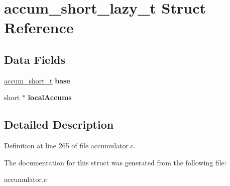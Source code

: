 \hypertarget{structaccum__short__lazy__t}{\section{accum\-\_\-short\-\_\-lazy\-\_\-t Struct Reference}
\label{structaccum__short__lazy__t}
}
\subsection*{Data Fields}
\begin{DoxyCompactItemize}
\item 
\hypertarget{structaccum__short__lazy__t_a1a0a6192758e6bbb414c27b4cf69623b}{\hyperlink{structaccum__short__t}{accum\-\_\-short\-\_\-t} {\bfseries base}}\label{structaccum__short__lazy__t_a1a0a6192758e6bbb414c27b4cf69623b}

\item 
\hypertarget{structaccum__short__lazy__t_a4c0bec8d0c751ee8120b5f4381fec482}{short $\ast$ {\bfseries local\-Accums}}\label{structaccum__short__lazy__t_a4c0bec8d0c751ee8120b5f4381fec482}

\end{DoxyCompactItemize}


\subsection{Detailed Description}


Definition at line 265 of file accumulator.\-c.



The documentation for this struct was generated from the following file\-:\begin{DoxyCompactItemize}
\item 
accumulator.\-c\end{DoxyCompactItemize}
